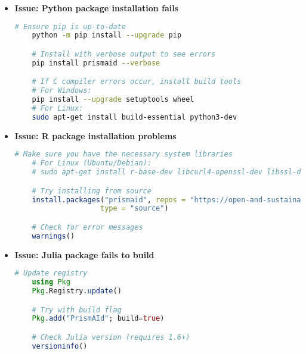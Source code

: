 \begin{itemize}
    \item \textbf{Issue: Python package installation fails}

    \begin{commandbox}
    \begin{lstlisting}[language=Bash]
    # Ensure pip is up-to-date
    python -m pip install --upgrade pip

    # Install with verbose output to see errors
    pip install prismaid --verbose

    # If C compiler errors occur, install build tools
    # For Windows:
    pip install --upgrade setuptools wheel
    # For Linux:
    sudo apt-get install build-essential python3-dev
    \end{lstlisting}
    \end{commandbox}

    \item \textbf{Issue: R package installation problems}

    \begin{commandbox}
    \begin{lstlisting}[language=R]
    # Make sure you have the necessary system libraries
    # For Linux (Ubuntu/Debian):
    # sudo apt-get install r-base-dev libcurl4-openssl-dev libssl-dev

    # Try installing from source
    install.packages("prismaid", repos = "https://open-and-sustainable.r-universe.dev",
                    type = "source")

    # Check for error messages
    warnings()
    \end{lstlisting}
    \end{commandbox}

    \item \textbf{Issue: Julia package fails to build}

    \begin{commandbox}
    \begin{lstlisting}[language=Julia]
    # Update registry
    using Pkg
    Pkg.Registry.update()

    # Try with build flag
    Pkg.add("PrismAId"; build=true)

    # Check Julia version (requires 1.6+)
    versioninfo()
    \end{lstlisting}
    \end{commandbox}
\end{itemize}

